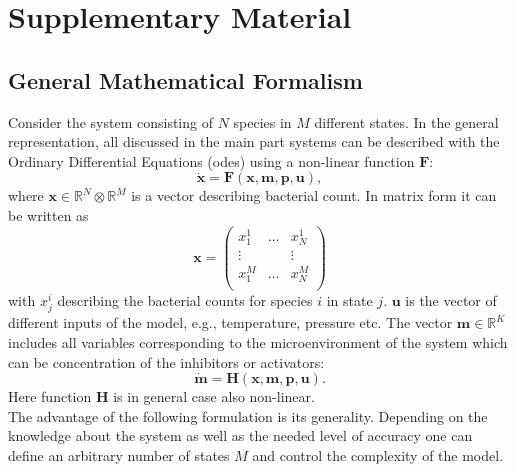 \documentclass[10pt,A4paper]{article}
\numberwithin{equation}{section}
\newcommand{\beginsupplement}{%
  \renewcommand{\thesection}{}
  \setcounter{subsection}{0}
  \renewcommand{\thesubsection}{S\arabic{subsection}}
  \setcounter{table}{0}
  \renewcommand{\thetable}{S\arabic{table}}%
  \setcounter{figure}{0}
  \renewcommand{\thefigure}{S\arabic{figure}}%
  \setcounter{listing}{0}
  \renewcommand{\thelisting}{S\arabic{listing}}
}
\newcommand{\mbx}{\mathbf{x}}
\newcommand{\mbm}{\mathbf{m}}
\newcommand{\mbp}{\mathbf{p}}
\newcommand{\mbu}{\mathbf{u}}
\newcommand{\mbF}{\mathbf{F}}
\newcommand{\mbH}{\mathbf{H}}
\begin{document}
\onecolumn

\newpage
\printbibliography

\beginsupplement
\section{Supplementary Material}
\subsection{General Mathematical Formalism}  \label{ssec:supplement1}
Consider the system consisting of $N$ species in $M$ different states.
In the general representation, all discussed in the main part systems  can be described with the Ordinary Differential Equations (\acp{ode}) using a non-linear function $\mbF$:
\begin{equation}
   \dot{\mbx} = \mbF(\mbx, \mbm, \mbp, \mbu),
\label{eq:model_ODE_x}
\end{equation}
where  $\mbx \in \mathbb{R}^{N}  \otimes \mathbb{R}^{M}$ is a vector describing bacterial count.
In matrix form it can be written as
\begin{equation}
    \mbx = \begin{pmatrix}
        x^1_1  & \dots & x^1_N  \\
        \vdots &       & \vdots \\
        x^M_1  & \dots & x^M_N  \\
            \end{pmatrix}
    \label{eq:model_bact}
\end{equation}
with $x_{j}^{i}$ describing the bacterial counts for species $i$ in state $j$.
$\mbu$ is the vector of different inputs of the model, e.g., temperature, pressure etc.
The vector $\mbm \in \mathbb{R}^{K}$ includes all variables corresponding to the microenvironment of the system which can be concentration of the inhibitors or activators:
\begin{equation}
    \dot{\mbm} = \mbH (\mbx, \mbm, \mbp, \mbu).
    \label{eq:model_microenv}
\end{equation}
Here function $\mbH$ is in general case also non-linear.\\
%
The advantage of the following formulation is its generality.
Depending on the knowledge about the system as well as the needed level of accuracy one can define an arbitrary number of states $M$ and control the complexity of the model.
\end{document}
